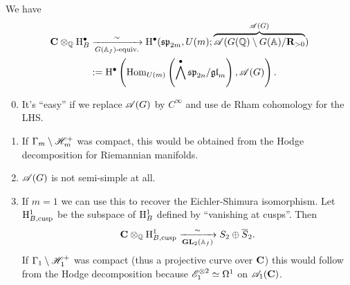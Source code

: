 \begin{theorem}
	We have
	\begin{align*}
		\mathbf{C}\otimes_\mathbb Q \mathrm{H}^{\bullet}_B &\xrightarrow[G(\mathbb{A}_f)\text{-equiv.}]{\sim} \mathrm{H}^{\bullet}(
			\mathfrak{sp}_{2m}, U(m); \overbrace{\mathscr{A}(G(\mathbb Q) \setminus G(\mathbb{A}) / \mathbf{R}_{>0}}^{\mathscr{A}(G)} )  \\
			&:= \mathrm{H}^{\bullet} \left( \operatorname{Hom}_{U(m)}\left( \bigwedge^{\bullet}\mathfrak{sp}_{2n} / \mathfrak{gl}_m
			\right) , \mathscr{A}(G) \right) .
		\end{align*}
	\end{theorem}
	\begin{remark}\leavevmode
	\begin{enumerate}[1)]
			\setcounter{enumi}{-1}
		\item It's ``easy'' if we replace $\mathscr{A}(G)$ by $C^{\infty}$ and use de Rham cohomology for the LHS.
		\item If $\Gamma_m\setminus \mathscr H_m^{+}$ was compact, this would be obtained from the
			Hodge decomposition for Riemannian manifolds.
		\item $\mathscr{A}(G)$ is not semi-simple at all.
		\item If $m=1$ we can use this to recover the Eichler-Shimura isomorphism. Let
			$\mathrm{H}^{1}_{B,\text{cusp}}$ be the subspace of $\mathrm{H}^{1}_B$ defined by ``vanishing at cusps''. Then
			\[
				\mathbf{C}\otimes_\mathbb Q \mathrm{H}^{1}_{B,\text{cusp}} \xrightarrow[\mathbf{GL}_2(\mathbb{A}_f)]{\sim} S_2 \oplus \overline{S}_2.
			\]
			If $\Gamma_1\setminus\mathscr H_1^{+}$ was compact (thus a projective curve over $\mathbf{C}$) this
			would follow from the Hodge decomposition because $\mathscr{E}_1^{\otimes 2}\simeq \Omega^{1}$
			on $\mathscr{A}_1(\mathbf{C})$.
	\end{enumerate}
\end{remark}
